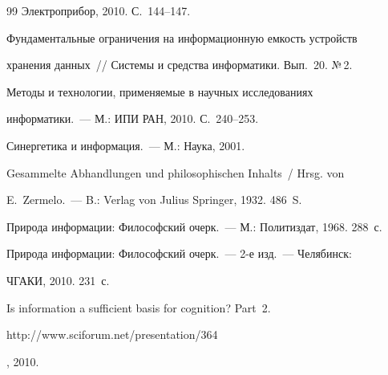 {{\begin{thebibliography}{99}
Электроприбор, 2010. С.~144--147.









Фундаментальные ограничения на информационную емкость устройств 


хранения данных~/\!\!/ Системы и средства информатики. Вып.~20. №\,2. 


Методы и технологии, применяемые в научных исследованиях 


информатики.~--- М.: ИПИ РАН, 2010. С.~240--253.









Синергетика и информация.~--- М.: Наука, 2001.









Gesammelte Abhandlungen und philosophischen Inhalts~/ Hrsg. von 


E.~Zermelo.~--- B.: Verlag von Julius Springer, 1932. 486~S.









Природа информации: Философский очерк.~--- М.: Политиздат, 1968. 288~с.









Природа информации: Философский очерк.~--- 2-е изд.~--- Челябинск: 


ЧГАКИ, 2010. 231~с.









Is information a sufficient basis for cognition? Part~2. {\sf 


http://www.sciforum.net/presentation/364}, 2010.






\end{thebibliography}}}
